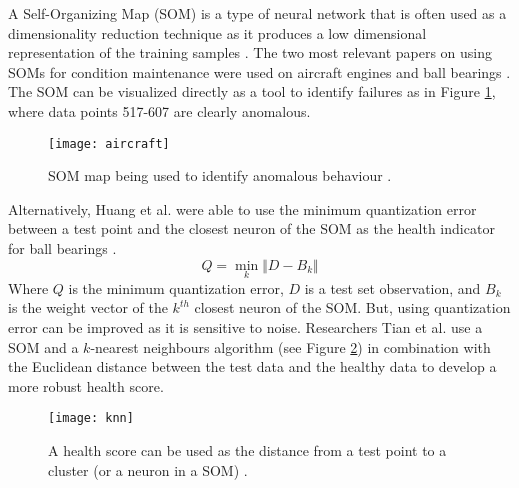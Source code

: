 A Self-Organizing Map (SOM) is a type of neural network that is often used as a dimensionality reduction technique as it produces a low dimensional representation of the training samples \cite{map1990self}.
The two most relevant papers on using SOMs for condition maintenance were used on aircraft engines and ball bearings \cite{come2010aircraft} \cite{Tian2014AnomalyDU}.
The SOM can be visualized directly as a tool to identify failures as in Figure \ref{aircraft}, where data points 517-607 are clearly anomalous.
\begin{figure}[!h]
    \texttt{[image: aircraft]}
    \centering
    \caption{SOM map being used to identify anomalous behaviour \cite{come2010aircraft}.}
    \label{aircraft}
\end{figure}
Alternatively, Huang et al. were able to use the minimum quantization error between a test point and the closest neuron of the SOM as the health indicator for ball bearings \cite{som-1}.
\begin{equation}
	Q = \min_{k} \Vert D-B_k \Vert
\end{equation}
 Where $Q$ is the minimum quantization error, $D$ is a test set observation, and $B_k$ is the weight vector of the $k^{th}$ closest neuron of the SOM.
But, using quantization error can be improved as it is sensitive to noise.
Researchers Tian et al. use a SOM and a $k$-nearest neighbours algorithm (see Figure \ref{knn}) in combination with the Euclidean distance between the test data and the healthy data to develop a more robust health score.
\begin{figure}[!h]
    \texttt{[image: knn]}
    \centering
    \caption{A health score can be used as the distance from a test point to a cluster (or a neuron in a SOM) \cite{Tian2014AnomalyDU}.}
    \label{knn}
\end{figure}
